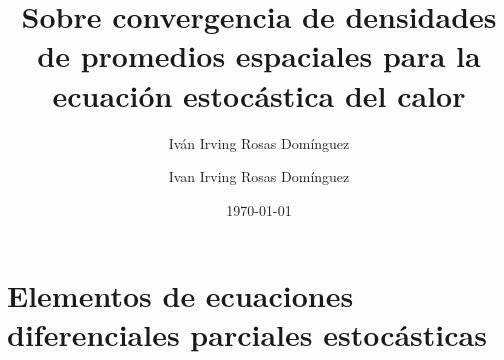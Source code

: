 \documentclass[letterpaper,twoside]{book}
\title{\textbf{}}
\author{Iván Irving Rosas Domínguez}
\date{\today}
\author{Ivan Irving Rosas Domínguez}
\title{Sobre convergencia de densidades de promedios espaciales para la ecuación estocástica del calor}
\newcommand{\1}{\mathds{1}}
\theoremstyle{definition}
\theoremstyle{definition}
\theoremstyle{definition}
\theoremstyle{definition}
\theoremstyle{definition}
\theoremstyle{definition}
\theoremstyle{definition}
\begin{document}
\maketitle 

\thispagestyle{empty}  

\frontmatter







\tableofcontents







\mainmatter

\chapter{Elementos de ecuaciones diferenciales parciales estocásticas}
\end{document}
